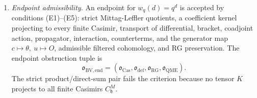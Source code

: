 \begin{enumerate}
  \item \emph{Endpoint admissibility.}
  An endpoint for \(w_q(d)=q^d\) is accepted by conditions (E1)--(E5):
  strict Mittag-Leffler quotients, a coefficient kernel projecting to
  every finite Casimir, transport of differential, bracket, coadjoint
  action, propagator, interaction, counterterms, and the generator map
  \(c\mapsto\theta,\ u\mapsto O\), admissible filtered cohomology, and
  RG preservation.  The endpoint obstruction tuple is
  \[
    \mathfrak o_{\mathrm{BV,end}}
    =
    (\mathfrak o_{\mathrm{Cas}},
     \mathfrak o_{\mathrm{def}},
     \mathfrak o_{\mathrm{RG}},
     \mathfrak o_{\mathrm{QME}}).
  \]
  The strict product/direct-sum pair fails the criterion because no
  tensor \(K\) projects to all finite Casimirs
  \(C^M_{\mathfrak h}\).


\end{enumerate}
